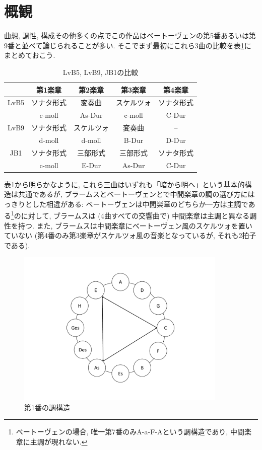 
\section{概観}

曲想, 調性, 構成その他多くの点でこの作品はベートーヴェンの第5番あるいは第9番と並べて論じられることが多い.
そこでまず最初にこれら3曲の比較を表\ref{comparison}にまとめておこう.

\begin{table}[htbp]
	\centering
	\begin{tabular}{c|cccc}
		& 第1楽章 & 第2楽章 & 第3楽章 & 第4楽章 \\ \hline
		LvB5 & ソナタ形式 & 変奏曲 & スケルツォ & ソナタ形式 \\
		& c-moll & As-Dur & c-moll & C-Dur \\ \hline
		LvB9 & ソナタ形式 & スケルツォ & 変奏曲 & -- \\
		& d-moll & d-moll & B-Dur & D-Dur \\ \hline
		JB1 & ソナタ形式 & 三部形式 & 三部形式 & ソナタ形式 \\
		& c-moll & E-Dur & As-Dur & C-Dur
	\end{tabular}
	\caption{LvB5, LvB9, JB1の比較}
	\label{comparison}
\end{table}

表\ref{comparison}から明らかなように, これら三曲はいずれも「暗から明へ」という基本的構造は共通であるが,
ブラームスとベートーヴェンとで中間楽章の調の選び方にはっきりとした相違がある:
ベートーヴェンは中間楽章のどちらか一方は主調である\footnote{ベートーヴェンの場合,
唯一第7番のみA-a-F-Aという調構造であり, 中間楽章に主調が現れない.}のに対して, ブラームスは (4曲すべての交響曲で) 中間楽章は主調と異なる調性を持つ.
また, ブラームスは中間楽章にベートーヴェン風のスケルツォを置いていない (第4番のみ第3楽章がスケルツォ風の音楽となっているが, それも2拍子である).

\begin{figure}[htbp]
	\centering
	\includegraphics[clip,width=10.0cm]{./figure/modulatory.pdf}
	\caption{第1番の調構造}
	\label{modulatory}
\end{figure}

